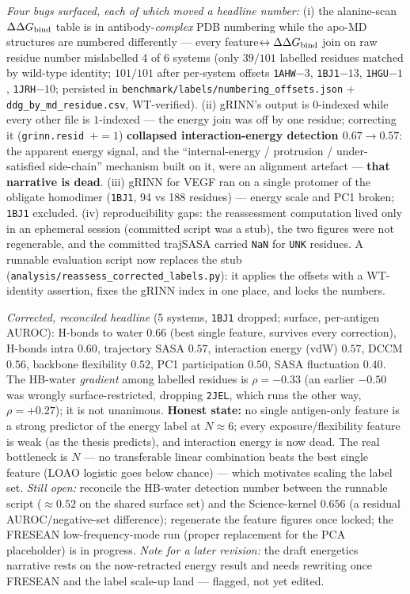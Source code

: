 \emph{Four bugs surfaced, each of which moved a headline number:} (i) the alanine-scan $\Delta\Delta G_{\mathrm{bind}}$ table is
in antibody-\emph{complex} PDB numbering while the apo-MD structures are numbered differently --- every
feature$\leftrightarrow\Delta\Delta G_{\mathrm{bind}}$ join on raw residue number mislabelled 4 of 6 systems (only $39/101$
labelled residues matched by wild-type identity; $101/101$ after per-system offsets
\texttt{1AHW}$-3$, \texttt{1BJ1}$-13$, \texttt{1HGU}$-1$, \texttt{1JRH}$-10$; persisted in
\texttt{benchmark/labels/numbering\_offsets.json} + \texttt{ddg\_by\_md\_residue.csv}, WT-verified).
(ii) gRINN's output is $0$-indexed while every other file is $1$-indexed --- the energy join was off by
one residue; correcting it (\texttt{grinn.resid $+=1$}) \textbf{collapsed interaction-energy detection
$0.67\to0.57$}: the apparent energy signal, and the ``internal-energy / protrusion / under-satisfied
side-chain'' mechanism built on it, were an alignment artefact --- \textbf{that narrative is dead}.
(iii) gRINN for VEGF ran on a single protomer of the obligate homodimer (\texttt{1BJ1}, 94 vs 188
residues) --- energy scale and PC1 broken; \texttt{1BJ1} excluded. (iv) reproducibility gaps: the
reassessment computation lived only in an ephemeral session (committed script was a stub), the two
figures were not regenerable, and the committed trajSASA carried \texttt{NaN} for \texttt{UNK}
residues. A runnable evaluation script now replaces the stub
(\texttt{analysis/reassess\_corrected\_labels.py}): it applies the offsets with a WT-identity assertion,
fixes the gRINN index in one place, and locks the numbers.

\emph{Corrected, reconciled headline} (5 systems, \texttt{1BJ1} dropped; surface, per-antigen AUROC):
H-bonds to water $0.66$ (best single feature, survives every correction), H-bonds intra $0.60$,
trajectory SASA $0.57$, interaction energy (vdW) $0.57$, DCCM $0.56$, backbone flexibility $0.52$,
PC1 participation $0.50$, SASA fluctuation $0.40$. The HB-water \emph{gradient} among labelled residues
is $\rho=-0.33$ (an earlier $-0.50$ was wrongly surface-restricted, dropping \texttt{2JEL}, which runs
the other way, $\rho=+0.27$); it is not unanimous. \textbf{Honest state:} no single antigen-only feature
is a strong predictor of the energy label at $N\approx6$; every exposure/flexibility feature is weak
(as the thesis predicts), and interaction energy is now dead. The real bottleneck is $N$ --- no
transferable linear combination beats the best single feature (LOAO logistic goes below chance) ---
which motivates scaling the label set. \emph{Still open:} reconcile the HB-water detection number
between the runnable script ($\approx0.52$ on the shared surface set) and the Science-kernel $0.656$
(a residual AUROC/negative-set difference); regenerate the feature figures once locked; the
FRESEAN low-frequency-mode run (proper replacement for the PCA placeholder) is in progress.
\emph{Note for a later revision:} the draft energetics narrative rests on the now-retracted energy
result and needs rewriting once FRESEAN and the label scale-up land --- flagged, not yet edited.

